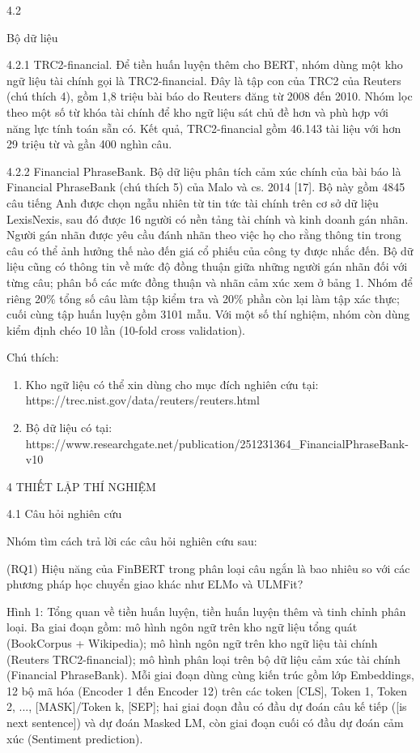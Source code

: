 4.2

Bộ dữ liệu

4.2.1 TRC2-financial. Để tiền huấn luyện thêm cho BERT, nhóm dùng một kho ngữ liệu tài chính gọi là TRC2-financial. Đây là tập con của TRC2 của Reuters (chú thích 4), gồm 1,8 triệu bài báo do Reuters đăng từ 2008 đến 2010. Nhóm lọc theo một số từ khóa tài chính để kho ngữ liệu sát chủ đề hơn và phù hợp với năng lực tính toán sẵn có. Kết quả, TRC2-financial gồm 46.143 tài liệu với hơn 29 triệu từ và gần 400 nghìn câu.

4.2.2 Financial PhraseBank. Bộ dữ liệu phân tích cảm xúc chính của bài báo là Financial PhraseBank (chú thích 5) của Malo và cs. 2014 {[}17{]}. Bộ này gồm 4845 câu tiếng Anh được chọn ngẫu nhiên từ tin tức tài chính trên cơ sở dữ liệu LexisNexis, sau đó được 16 người có nền tảng tài chính và kinh doanh gán nhãn. Người gán nhãn được yêu cầu đánh nhãn theo việc họ cho rằng thông tin trong câu có thể ảnh hưởng thế nào đến giá cổ phiếu của công ty được nhắc đến. Bộ dữ liệu cũng có thông tin về mức độ đồng thuận giữa những người gán nhãn đối với từng câu; phân bố các mức đồng thuận và nhãn cảm xúc xem ở bảng 1. Nhóm để riêng 20\% tổng số câu làm tập kiểm tra và 20\% phần còn lại làm tập xác thực; cuối cùng tập huấn luyện gồm 3101 mẫu. Với một số thí nghiệm, nhóm còn dùng kiểm định chéo 10 lần (10-fold cross validation).

Chú thích:

\begin{enumerate}
\def\labelenumi{\arabic{enumi}.}
\setcounter{enumi}{3}
\item
  Kho ngữ liệu có thể xin dùng cho mục đích nghiên cứu tại: https://trec.nist.gov/data/reuters/reuters.html
\item
  Bộ dữ liệu có tại: https://www.researchgate.net/publication/251231364\_FinancialPhraseBank-v10
\end{enumerate}

4 THIẾT LẬP THÍ NGHIỆM

4.1 Câu hỏi nghiên cứu

Nhóm tìm cách trả lời các câu hỏi nghiên cứu sau:

(RQ1) Hiệu năng của FinBERT trong phân loại câu ngắn là bao nhiêu so với các phương pháp học chuyển giao khác như ELMo và ULMFit?

Hình 1: Tổng quan về tiền huấn luyện, tiền huấn luyện thêm và tinh chỉnh phân loại. Ba giai đoạn gồm: mô hình ngôn ngữ trên kho ngữ liệu tổng quát (BookCorpus + Wikipedia); mô hình ngôn ngữ trên kho ngữ liệu tài chính (Reuters TRC2-financial); mô hình phân loại trên bộ dữ liệu cảm xúc tài chính (Financial PhraseBank). Mỗi giai đoạn dùng cùng kiến trúc gồm lớp Embeddings, 12 bộ mã hóa (Encoder 1 đến Encoder 12) trên các token {[}CLS{]}, Token 1, Token 2, ..., {[}MASK{]}/Token k, {[}SEP{]}; hai giai đoạn đầu có đầu dự đoán câu kế tiếp ({[}is next sentence{]}) và dự đoán Masked LM, còn giai đoạn cuối có đầu dự đoán cảm xúc (Sentiment prediction).

